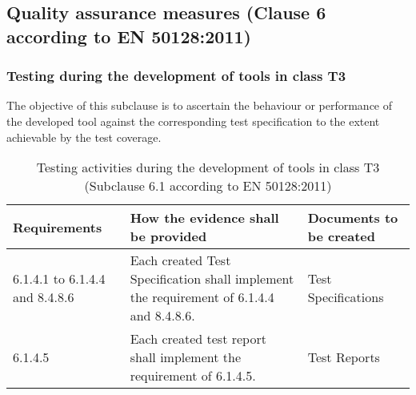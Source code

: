 \documentclass{template/openetcs_report}
\begin{document}
\subsection{Quality assurance measures (Clause 6 according to EN 50128:2011)}
\label{clause6}
\subsubsection{Testing during the development of tools in class T3}
\begin{flushleft}
The objective of this subclause is to ascertain the behaviour or performance of the developed tool against the corresponding test specification to the extent achievable by the test coverage.
\end{flushleft}
{\footnotesize\sffamily\centering
\begin{longtable}{|p{2cm}|p{9cm}|p{3cm}|}
\caption{Testing activities during the development of tools in class T3 (Subclause 6.1 according to EN 50128:2011)}\\
\hline
\bfseries Requirements & \bfseries How the evidence shall be provided & \bfseries Documents to be created\\
\hline
\hline
\endhead
\hline
\endfoot

6.1.4.1 to 6.1.4.4 and 8.4.8.6 & Each created Test Specification shall implement the requirement of 6.1.4.4 and 8.4.8.6.
& Test Specifications \\ 
\hline
6.1.4.5 & Each created test report shall implement the requirement of 6.1.4.5.
& Test Reports \\ 
\hline
\end{longtable}}
\end{document}

